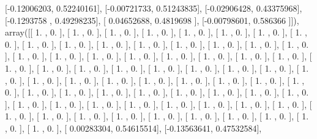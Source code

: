 \documentclass{article}
\begin{document}
       [-0.12006203,  0.52240161],
       [-0.00721733,  0.51243835],
       [-0.02906428,  0.43375968],
       [-0.1293758 ,  0.49298235],
       [ 0.04652688,  0.4819698 ],
       [-0.00798601,  0.586366  ]]), array([[ 1.        ,  0.        ],
       [ 1.        ,  0.        ],
       [ 1.        ,  0.        ],
       [ 1.        ,  0.        ],
       [ 1.        ,  0.        ],
       [ 1.        ,  0.        ],
       [ 1.        ,  0.        ],
       [ 1.        ,  0.        ],
       [ 1.        ,  0.        ],
       [ 1.        ,  0.        ],
       [ 1.        ,  0.        ],
       [ 1.        ,  0.        ],
       [ 1.        ,  0.        ],
       [ 1.        ,  0.        ],
       [ 1.        ,  0.        ],
       [ 1.        ,  0.        ],
       [ 1.        ,  0.        ],
       [ 1.        ,  0.        ],
       [ 1.        ,  0.        ],
       [ 1.        ,  0.        ],
       [ 1.        ,  0.        ],
       [ 1.        ,  0.        ],
       [ 1.        ,  0.        ],
       [ 1.        ,  0.        ],
       [ 1.        ,  0.        ],
       [ 1.        ,  0.        ],
       [ 1.        ,  0.        ],
       [ 1.        ,  0.        ],
       [ 1.        ,  0.        ],
       [ 1.        ,  0.        ],
       [ 1.        ,  0.        ],
       [ 1.        ,  0.        ],
       [ 1.        ,  0.        ],
       [ 1.        ,  0.        ],
       [ 1.        ,  0.        ],
       [ 1.        ,  0.        ],
       [ 1.        ,  0.        ],
       [ 1.        ,  0.        ],
       [ 1.        ,  0.        ],
       [ 1.        ,  0.        ],
       [ 1.        ,  0.        ],
       [ 1.        ,  0.        ],
       [ 1.        ,  0.        ],
       [ 1.        ,  0.        ],
       [ 1.        ,  0.        ],
       [ 1.        ,  0.        ],
       [ 1.        ,  0.        ],
       [ 1.        ,  0.        ],
       [ 1.        ,  0.        ],
       [ 1.        ,  0.        ],
       [ 1.        ,  0.        ],
       [ 1.        ,  0.        ],
       [ 1.        ,  0.        ],
       [ 1.        ,  0.        ],
       [ 1.        ,  0.        ],
       [ 1.        ,  0.        ],
       [ 1.        ,  0.        ],
       [ 1.        ,  0.        ],
       [ 1.        ,  0.        ],
       [ 1.        ,  0.        ],
       [ 1.        ,  0.        ],
       [ 1.        ,  0.        ],
       [ 1.        ,  0.        ],
       [ 1.        ,  0.        ],
       [ 1.        ,  0.        ],
       [ 1.        ,  0.        ],
       [ 1.        ,  0.        ],
       [ 0.00283304,  0.54615514],
       [-0.13563641,  0.47532584],
\end{document}

